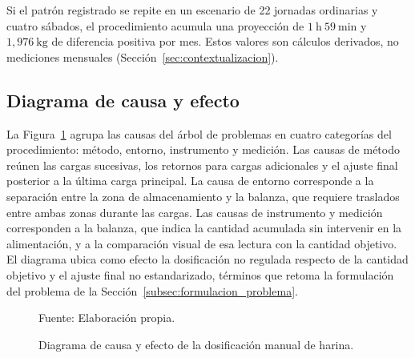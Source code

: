 Si el patrón registrado se repite en un escenario de 22 jornadas ordinarias
y cuatro sábados, el procedimiento acumula una proyección de
$1\ \mathrm{h}\ 59\ \mathrm{min}$ y $1{,}976\ \mathrm{kg}$ de diferencia
positiva por mes. Estos valores son cálculos derivados, no mediciones
mensuales (Sección~\ref{sec:contextualizacion}).

\subsection{Diagrama de causa y efecto}
\label{subsec:arbol_problemas}  %


La Figura~\ref{fig:ishikawa_dosificacion} agrupa las causas del árbol de
problemas en cuatro categorías del procedimiento: método, entorno,
instrumento y medición. Las causas de método reúnen las cargas sucesivas,
los retornos para cargas adicionales y el ajuste final posterior a la última
carga principal. La causa de entorno corresponde a la separación entre la
zona de almacenamiento y la balanza, que requiere traslados entre ambas
zonas durante las cargas. Las causas de instrumento y medición
corresponden a la balanza, que indica la cantidad acumulada sin intervenir
en la alimentación, y a la comparación visual de esa lectura con la
cantidad objetivo. El diagrama ubica como efecto la dosificación no regulada
respecto de la cantidad objetivo y el ajuste final no estandarizado,
términos que retoma la formulación del problema de la
Sección~\ref{subsec:formulacion_problema}.

\begin{figure}[H]
    \centering

    \resizebox{0.95\textwidth}{!}{%
        {\setlength{\fboxsep}{6pt}
        \fbox{%
            
        }}
    }

    \caption{Diagrama de causa y efecto de la dosificación manual de harina.}
    \label{fig:ishikawa_dosificacion}

    \vspace{0.2em}
    {\footnotesize Fuente: Elaboración propia.}

\end{figure}

